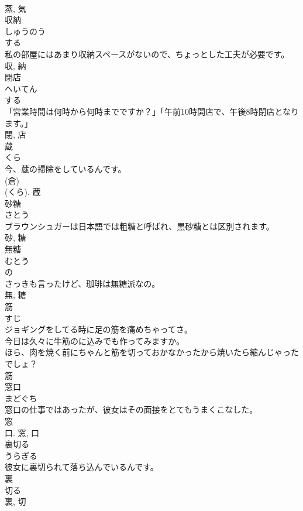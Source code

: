 \documentclass[8pt]{extreport}
\begin{document}
\begin{CJK}{UTF8}{min}
\\	蒸, 気	
\\	収納	
\\	しゅうのう	
\\	する 
\\	私の部屋にはあまり収納スペースがないので、ちょっとした工夫が必要です。	
\\	収, 納	
\\	閉店	
\\	へいてん	
\\	する 
\\	「営業時間は何時から何時までですか？」「午前10時開店で、午後8時閉店となります。」	
\\	閉, 店	
\\	蔵	
\\	くら	
\\	今、蔵の掃除をしているんです。	
\\	(倉) 
\\	(くら).	蔵	
\\	砂糖	
\\	さとう	
\\	ブラウンシュガーは日本語では粗糖と呼ばれ、黒砂糖とは区別されます。	
\\	砂, 糖	
\\	無糖	
\\	むとう	
\\	の 
\\	さっきも言ったけど、珈琲は無糖派なの。	
\\	無, 糖	
\\	筋	
\\	すじ	
\\	ジョギングをしてる時に足の筋を痛めちゃってさ。	
\\	今日は久々に牛筋のに込みでも作ってみますか。	
\\	ほら、肉を焼く前にちゃんと筋を切っておかなかったから焼いたら縮んじゃったでしょ？	
\\	筋	
\\	窓口	
\\	まどぐち	
\\	窓口の仕事ではあったが、彼女はその面接をとてもうまくこなした。	
\\	窓 
\\	口.	窓, 口	
\\	裏切る	
\\	うらぎる	
\\	彼女に裏切られて落ち込んでいるんです。	
\\	裏 
\\	切る 
\\	裏, 切	

\end{CJK}
\end{document}
